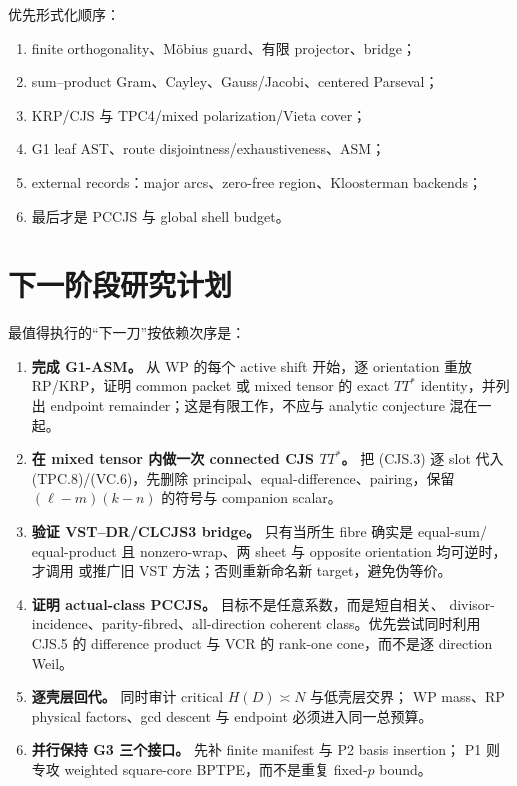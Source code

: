 \documentclass[11pt,a4paper]{ctexart}
\theoremstyle{definition}
\newcommand{\1}{\mathbf 1}
\begin{document}
优先形式化顺序：
\begin{enumerate}
\item finite orthogonality、Möbius guard、有限 projector、bridge；
\item sum--product Gram、Cayley、Gauss/Jacobi、centered Parseval；
\item KRP/CJS 与 TPC4/mixed polarization/Vieta cover；
\item G1 leaf AST、route disjointness/exhaustiveness、ASM；
\item external records：major arcs、zero-free region、Kloosterman backends；
\item 最后才是 PCCJS 与 global shell budget。
\end{enumerate}

\section{下一阶段研究计划}

最值得执行的“下一刀”按依赖次序是：
\begin{enumerate}
\item \textbf{完成 G1-ASM。} 从 WP 的每个 active shift 开始，逐 orientation 重放
RP/KRP，证明 common packet 或 mixed tensor 的 exact $TT^*$ identity，并列出
endpoint remainder；这是有限工作，不应与 analytic conjecture 混在一起。
\item \textbf{在 mixed tensor 内做一次 connected CJS $TT^*$。} 把 (CJS.3) 逐 slot
代入 (TPC.8)/(VC.6)，先删除 principal、equal-difference、pairing，保留
$(\ell-m)(k-n)$ 的符号与 companion scalar。
\item \textbf{验证 VST--DR/CLCJS3 bridge。} 只有当所生 fibre 确实是 equal-sum/
equal-product 且 nonzero-wrap、两 sheet 与 opposite orientation 均可逆时，才调用
或推广旧 VST 方法；否则重新命名新 target，避免伪等价。
\item \textbf{证明 actual-class PCCJS。} 目标不是任意系数，而是短自相关、
divisor-incidence、parity-fibred、all-direction coherent class。优先尝试同时利用
CJS.5 的 difference product 与 VCR 的 rank-one cone，而不是逐 direction Weil。
\item \textbf{逐壳层回代。} 同时审计 critical $H(D)\asymp N$ 与低壳层交界；
WP mass、RP physical factors、gcd descent 与 endpoint 必须进入同一总预算。
\item \textbf{并行保持 G3 三个接口。} 先补 finite manifest 与 P2 basis insertion；
P1 则专攻 weighted square-core BPTPE，而不是重复 fixed-$p$ bound。
\end{enumerate}
\end{document}
